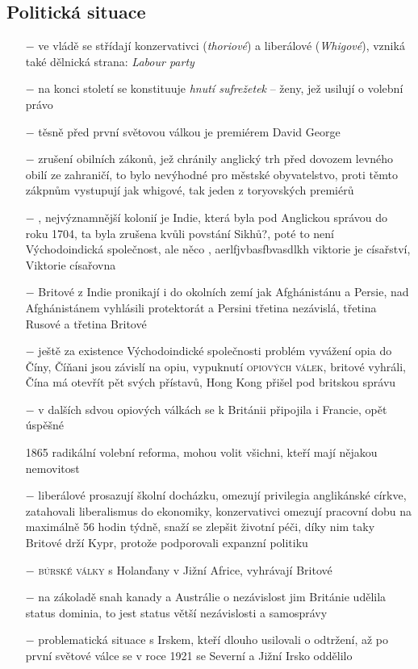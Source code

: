 \documentclass{article}
\begin{document}
\subsection*{Politická situace}
\begin{itemize}
    \vspace{-0.5em}
    \setlength\itemsep{0.15em}
    \item[$-$] ve vládě se střídají konzervativci (\textit{thoriové}) a liberálové (\textit{Whigové}), vzniká také dělnická strana: \textit{Labour party}
    \item[$-$] na konci století se konstituuje \textit{hnutí sufrežetek} -- ženy, jež usilují o volební právo
    \item[$-$] těsně před první světovou válkou je premiérem    David George
    \item[$-$] zrušení obilních zákonů, jež chránily anglický trh před dovozem levného obilí ze zahraničí, to bylo nevýhodné pro městské obyvatelstvo, proti těmto zákpnům vystupují jak whigové, tak jeden z toryovských premiérů
    \item[$-$] , nejvýznamnější kolonií je Indie, která byla pod Anglickou správou do roku 1704, ta byla zrušena kvůli povstání Sikhů?, poté to není Východoindická společnost, ale  něco , aerlfjvbasfbvasdlkh viktorie je císařství, Viktorie císařovna
    \item[$-$] Britové z Indie pronikají i do okolních zemí jak Afghánistánu a Persie, nad Afghánistánem vyhlásili protektorát a Persini třetina nezávislá, třetina Rusové a třetina Britové
    \item[$-$] ještě za existence Východoindické společnosti problém vyvážení opia do Číny, Číňani jsou závislí na opiu, vypuknutí \textsc{opiových válek}, britové vyhráli, Čína má otevřít pět svých přístavů, Hong Kong přišel pod britskou správu
    \item[$-$] v dalších sdvou opiových válkách se k Británii připojila i Francie, opět úspěšné
    \item[1865] radikální volební reforma, mohou volit všichni, kteří mají nějakou nemovitost
    \item[$-$] liberálové prosazují školní docházku, omezují privilegia anglikánské církve, zatahovali liberalismus do ekonomiky, konzervativci omezují pracovní dobu na maximálně 56 hodin týdně, snaží se zlepšit životní péči, díky nim taky Britové drží Kypr, protože podporovali expanzní politiku
    \item[$-$] \textsc{búrské války} s Holanďany v Jižní Africe, vyhrávají Britové
    \item[$-$] na zákoladě snah kanady a Austrálie o nezávislost jim Británie udělila status dominia, to jest status větší nezávislosti a samosprávy
    \item[$-$] problematická situace s Irskem, kteří dlouho usilovali o odtržení, až po první světové válce se v roce 1921 se Severní a Jižní Irsko oddělilo
\end{itemize}
\end{document}
